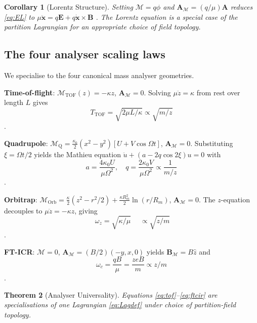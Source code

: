 \documentclass[twocolumn,10pt,a4paper]{article}
\theoremstyle{thmstyle}
\newtheorem{theorem}{Theorem}[section]
\newtheorem{corollary}[theorem]{Corollary}
\theoremstyle{definition}
\theoremstyle{remark}
\newcommand{\Depth}{\mathcal{M}}
\newcommand{\partinert}{\mu}
\newcommand{\Apartition}{\mathbf{A}_{\Depth}}
\begin{document}
\begin{corollary}[Lorentz Structure]
\label{cor:lor}
Setting $\Depth=q\phi$ and $\Apartition=(q/\partinert)\mathbf{A}$
reduces \eqref{eq:EL} to
$\partinert\ddot{\mathbf{x}}=q\mathbf{E}+q\dot{\mathbf{x}}\times\mathbf{B}$
\citep{jackson1999}. The Lorentz equation is a special case of the
partition Lagrangian for an appropriate choice of field topology.
\end{corollary}

\subsection{The four analyser scaling laws}

We specialise to the four canonical mass analyser geometries.

\textbf{Time-of-flight}: $\Depth_{\mathrm{TOF}}(z)=-\kappa z$,
$\Apartition=0$. Solving $\partinert\ddot z=\kappa$ from rest over
length $L$ gives
\begin{equation}
T_{\mathrm{TOF}}=\sqrt{2\partinert L/\kappa}\propto\sqrt{m/z}
\label{eq:tof}
\end{equation}
\citep{wiley1955}.

\textbf{Quadrupole}: $\Depth_{\mathrm{Q}}=\tfrac{\kappa_{0}}{2}(x^{2}-y^{2})[U+V\cos\Omega t]$,
$\Apartition=0$. Substituting $\xi=\Omega t/2$ yields the Mathieu
equation $\ddot u+(a-2q\cos 2\xi)u=0$ with
\begin{equation}
a=\frac{4\kappa_{0}U}{\partinert\Omega^{2}},\quad
q=\frac{2\kappa_{0}V}{\partinert\Omega^{2}}\propto\frac{1}{m/z}
\label{eq:mathieu}
\end{equation}
\citep{paul1990,march2005}.

\textbf{Orbitrap}: $\Depth_{\mathrm{Orb}}=\tfrac{\kappa}{2}(z^{2}-r^{2}/2)
+\tfrac{\kappa R_{m}^{2}}{2}\ln(r/R_{m})$, $\Apartition=0$. The
$z$-equation decouples to $\partinert\ddot z=-\kappa z$, giving
\begin{equation}
\boxed{\;\omega_{z}=\sqrt{\kappa/\partinert}\;}
\quad\propto\sqrt{z/m}
\label{eq:orb}
\end{equation}
\citep{makarov2000}.

\textbf{FT-ICR}: $\Depth=0$, $\Apartition=(B/2)(-y,x,0)$ yields
$\mathbf{B}_{\Depth}=B\hat z$ and
\begin{equation}
\omega_{c}=\frac{qB}{\partinert}=\frac{zeB}{m}\propto z/m
\label{eq:ftcir}
\end{equation}
\citep{marshall1998}.

\begin{theorem}[Analyser Universality]
\label{thm:univ}
Equations \eqref{eq:tof}--\eqref{eq:ftcir} are specialisations of one
Lagrangian \eqref{eq:Lagdef} under choice of partition-field topology.
\end{theorem}
\end{document}
